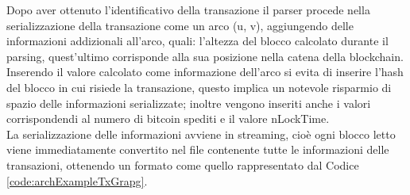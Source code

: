 \begin{example}
Dopo aver ottenuto l'identificativo della transazione il parser procede nella serializzazione della transazione come un arco (u, v), aggiungendo delle informazioni addizionali all'arco, quali: l'altezza del blocco calcolato durante il parsing, quest'ultimo corrisponde alla sua posizione nella catena della blockchain.
Inserendo il valore calcolato come informazione dell'arco si evita di inserire l'hash del blocco in cui risiede la transazione, questo implica un notevole risparmio di spazio delle informazioni serializzate; inoltre vengono inseriti anche i valori corrispondendi al numero di bitcoin spediti e il valore nLockTime.\\
La serializzazione delle informazioni avviene in streaming, cioè ogni blocco letto viene immediatamente convertito nel file contenente tutte le informazioni delle transazioni, ottenendo un formato come quello rappresentato dal Codice \ref{code:archExampleTxGrapg}.\\



\end{example}

